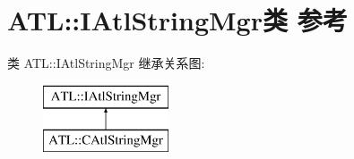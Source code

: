 \hypertarget{class_a_t_l_1_1_i_atl_string_mgr}{}\section{A\+TL\+:\+:I\+Atl\+String\+Mgr类 参考}
\label{class_a_t_l_1_1_i_atl_string_mgr}
类 A\+TL\+:\+:I\+Atl\+String\+Mgr 继承关系图\+:\begin{figure}[H]
\begin{center}
\leavevmode
\includegraphics[height=2.000000cm]{class_a_t_l_1_1_i_atl_string_mgr}
\end{center}
\end{figure}
